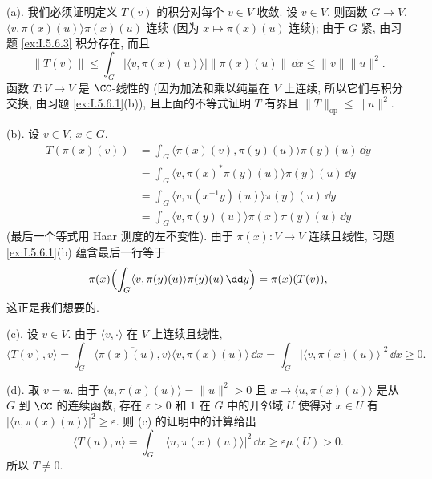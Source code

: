 \begin{solution}
(a). 我们必须证明定义 $T(v)$ 的积分对每个 $v \in V$ 收敛. 设 $v \in V$. 则函数 $G \to V$, $\langle v, \pi(x)(u) \rangle\pi(x)(u)$ 连续 (因为 $x \longmapsto \pi(x)(u)$ 连续); 由于 $G$ 紧, 由习题 \ref{ex:I.5.6.3} 积分存在, 而且
\[
\|T(v)\| \leq \int_G |\langle v, \pi(x)(u) \rangle|\|\pi(x)(u)\|\,\dd x \leq \|v\|\|u\|^2.
\]
函数 $T \colon V \to V$ 是 $\CC$-线性的 (因为加法和乘以纯量在 $V$ 上连续, 所以它们与积分交换, 由习题 \ref{ex:I.5.6.1}(b)), 且上面的不等式证明 $T$ 有界且 $\|T\|_{\mathrm{op}} \leq \|u\|^2$.

(b). 设 $v \in V$, $x \in G$.
\begin{align*}
T(\pi(x)(v)) &= \int_G \langle \pi(x)(v), \pi(y)(u) \rangle\pi(y)(u)\,\dd y \\
&= \int_G \langle v, \pi(x)^*\pi(y)(u) \rangle\pi(y)(u)\,\dd y \\
&= \int_G \langle v, \pi(x^{-1}y)(u) \rangle\pi(y)(u)\,\dd y \\
&= \int_G \langle v, \pi(y)(u) \rangle\pi(x)\pi(y)(u)\,\dd y
\end{align*}
(最后一个等式用 Haar 测度的左不变性). 由于 $\pi(x) \colon V \to V$ 连续且线性, 习题 \ref{ex:I.5.6.1}(b) 蕴含最后一行等于
\[
\pi(x)\Bigl(\int_G \langle v, \pi(y)(u) \rangle\pi(y)(u)\,\dd y\Bigr) = \pi(x)(T(v)),
\]
这正是我们想要的.

(c). 设 $v \in V$. 由于 $\langle v, \cdot \rangle$ 在 $V$ 上连续且线性,
\[
\langle T(v), v \rangle = \int_G \overline{\langle \pi(x)(u), v \rangle}\langle v, \pi(x)(u) \rangle\,\dd x = \int_G |\langle v, \pi(x)(u) \rangle|^2\,\dd x \geq 0.
\]

(d). 取 $v = u$. 由于 $\langle u, \pi(x)(u) \rangle = \|u\|^2 > 0$ 且 $x \longmapsto \langle u, \pi(x)(u) \rangle$ 是从 $G$ 到 $\CC$ 的连续函数, 存在 $\varepsilon > 0$ 和 $1$ 在 $G$ 中的开邻域 $U$ 使得对 $x \in U$ 有 $|\langle u, \pi(x)(u) \rangle|^2 \geq \varepsilon$. 则 (c) 的证明中的计算给出
\[
\langle T(u), u \rangle = \int_G |\langle u, \pi(x)(u) \rangle|^2\,\dd x \geq \varepsilon\mu(U) > 0.
\]
所以 $T \neq 0$.


\end{solution}
